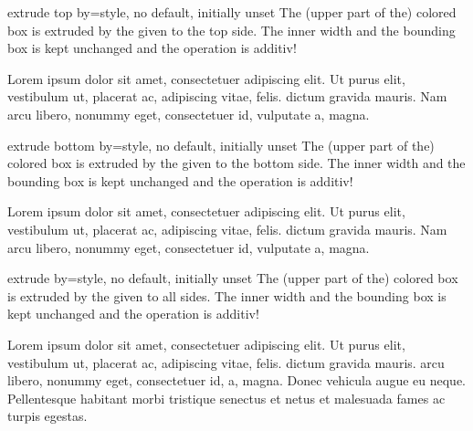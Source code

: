 \clearpage
\begin{docTcbKey}{extrude top by}{=}{style, no default, initially unset}
  The (upper part of the) colored box is extruded by the given  to the top side.
  The inner width and the bounding box is kept unchanged and the operation
  is additiv!
\begin{dispExample}

Lorem ipsum dolor sit amet, consectetuer adipiscing elit. Ut purus elit,
vestibulum ut, placerat ac, adipiscing vitae, felis.
 dictum gravida mauris.
Nam arcu libero, nonummy eget, consectetuer id, vulputate a, magna.
\end{dispExample}
\end{docTcbKey}

\begin{docTcbKey}{extrude bottom by}{=}{style, no default, initially unset}
  The (upper part of the) colored box is extruded by the given  to the bottom side.
  The inner width and the bounding box is kept unchanged and the operation
  is additiv!
\begin{dispExample}

Lorem ipsum dolor sit amet, consectetuer adipiscing elit. Ut purus elit,
vestibulum ut, placerat ac, adipiscing vitae, felis.
 dictum gravida mauris.
Nam arcu libero, nonummy eget, consectetuer id, vulputate a, magna.
\end{dispExample}
\end{docTcbKey}

\begin{docTcbKey}{extrude by}{=}{style, no default, initially unset}
  The (upper part of the) colored box is extruded by the given  to all sides.
  The inner width and the bounding box is kept unchanged and the operation
  is additiv!
\begin{dispExample}

Lorem ipsum dolor sit amet, consectetuer adipiscing elit. Ut purus elit,
vestibulum ut, placerat ac, adipiscing vitae, felis.  dictum
gravida mauris. 
arcu libero, nonummy eget, consectetuer id,  a, magna. Donec
vehicula augue eu neque. Pellentesque habitant morbi tristique senectus et netus
et malesuada fames ac turpis egestas. 
\end{dispExample}
\end{docTcbKey}

